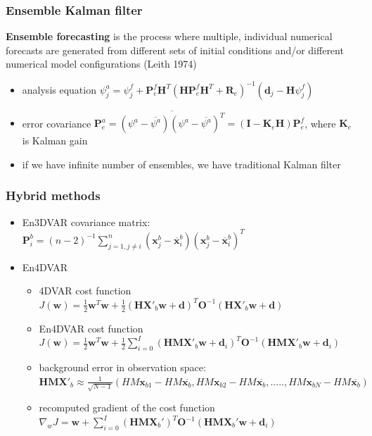 \documentclass{beamer}
\begin{document}
\begin{frame}
	\frametitle{Ensemble Kalman filter}
	
	\begin{definition}
		\textbf{Ensemble forecasting} is the process where multiple, individual numerical forecasts
		are generated from different sets of initial conditions
		and/or different numerical model configurations (Leith 1974)
	\end{definition}
	\begin{itemize}
		
		\item analysis equation $\psi ^{a} _{j}= \psi ^{f}_{j} + \textbf{P} _{e} ^{f}\textbf{H} ^{T}(\textbf{HP}_{e} ^{f}\textbf{H} ^{T}+\textbf{R}_{e}) ^{-1}(\textbf{d}_{j}-\textbf{H}\psi ^{f}_{j})$
		
		\item error covariance $\textbf{P}_{e}^{a} = \overline {(\psi^{a} - \overline{\psi^{a}})(\psi^{a} - \overline{\psi^{a}})^{T}} =  (\textbf{I}-\textbf{K}_{e}\textbf{H})\textbf{P}_{e}^{f}$, 
		where $\textbf{K}_{e}$ is Kalman gain
		\item if we have infinite number of ensembles, we have traditional Kalman filter

	\end{itemize}
\end{frame}

\begin{frame}
	\frametitle{Hybrid methods}

	\begin{itemize}
		
		\item En3DVAR covariance matrix: $\textbf{P}^{b}_{i} = (n-2)^{-1} \sum_{j=1, j \ne i}^{n}(\textbf{x}_{j}^{b} - \overline{\textbf{x}}_{i}^{b})(\textbf{x}_{j}^{b} - \overline{\textbf{x}}_{i}^{b})^{T}$
		
		\item En4DVAR
		\begin{itemize}
			\item 4DVAR cost function $J(\textbf{w}) = \frac{1}{2} \textbf{w}^{T}\textbf{w} + \frac{1}{2}(\textbf{H}\textbf{X}'_{b}\textbf{w}+\textbf{d})^{T}\textbf{O}^{-1}(\textbf{H}\textbf{X}'_{b}\textbf{w}+\textbf{d})$
			\item En4DVAR cost function $J(\textbf{w}) = \frac{1}{2} \textbf{w}^{T}\textbf{w} + \frac{1}{2}\sum_{i=0}^{I}(\textbf{HM}\textbf{X}'_{b}\textbf{w} + \textbf{d}_{i})^{T}\textbf{O}^{-1}(\textbf{HMX}'_{b}\textbf{w}+\textbf{d}_{i})$
			\item background error in observation space:
			$\textbf{HMX}'_{b} \approx \frac{1}{\sqrt{N-1}}(HM\textbf{x}_{b1}-HM\overline{\textbf{x}_{b}}, HM\textbf{x}_{b2}-HM\overline{\textbf{x}_{b}},.....,HM\textbf{x}_{bN}-HM\overline{\textbf{x}_{b}} )$
			\item recomputed gradient of the cost function $\nabla _{w}J = \textbf{w} + \sum_{i=0}^{I}(\textbf{HMX}_{b}')^{T}\textbf{O}^{-1}(\textbf{HMX}_{b}'\textbf{w}+\textbf{d}_{i})$
		\end{itemize}
		
	\end{itemize}
\end{frame}
\end{document}

